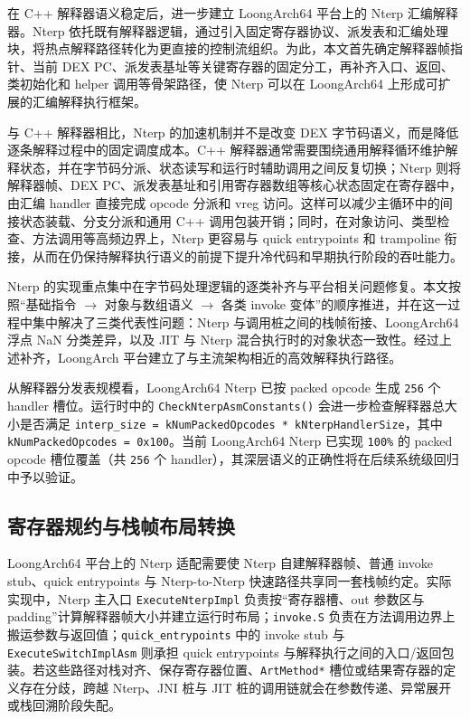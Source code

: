 在 C++ 解释器语义稳定后，进一步建立 LoongArch64 平台上的 Nterp 汇编解释器。Nterp 依托既有解释器逻辑，通过引入固定寄存器协议、派发表和汇编处理块，将热点解释路径转化为更直接的控制流组织\citep{Ertl2003,ArtJitCompiler2024}。为此，本文首先确定解释器帧指针、当前 DEX PC、派发表基址等关键寄存器的固定分工，再补齐入口、返回、类初始化和 helper 调用等骨架路径，使 Nterp 可以在 LoongArch64 上形成可扩展的汇编解释执行框架。

与 C++ 解释器相比，Nterp 的加速机制并不是改变 DEX 字节码语义，而是降低逐条解释过程中的固定调度成本。C++ 解释器通常需要围绕通用解释循环维护解释状态，并在字节码分派、状态读写和运行时辅助调用之间反复切换；Nterp 则将解释器帧、DEX PC、派发表基址和引用寄存器数组等核心状态固定在寄存器中，由汇编 handler 直接完成 opcode 分派和 vreg 访问。这样可以减少主循环中的间接状态装载、分支分派和通用 C++ 调用包装开销；同时，在对象访问、类型检查、方法调用等高频边界上，Nterp 更容易与 quick entrypoints 和 trampoline 衔接，从而在仍保持解释执行语义的前提下提升冷代码和早期执行阶段的吞吐能力。

Nterp 的实现重点集中在字节码处理逻辑的逐类补齐与平台相关问题修复。本文按照“基础指令 $\rightarrow$ 对象与数组语义 $\rightarrow$ 各类 invoke 变体”的顺序推进，并在这一过程中集中解决了三类代表性问题：Nterp 与调用桩之间的栈帧衔接、LoongArch64 浮点 NaN 分类差异，以及 JIT 与 Nterp 混合执行时的对象状态一致性。经过上述补齐，LoongArch 平台建立了与主流架构相近的高效解释执行路径。

从解释器分发表规模看，LoongArch64 Nterp 已按 packed opcode 生成 \texttt{256} 个 handler 槽位。运行时中的 \texttt{CheckNterpAsmConstants()} 会进一步检查解释器总大小是否满足 \texttt{interp\_size = kNumPackedOpcodes * kNterpHandlerSize}，其中 \texttt{kNumPackedOpcodes = 0x100}。当前 LoongArch64 Nterp 已实现 \texttt{100\%} 的 packed opcode 槽位覆盖（共 \texttt{256} 个 handler），其深层语义的正确性将在后续系统级回归中予以验证。

\subsection{寄存器规约与栈帧布局转换}

LoongArch64 平台上的 Nterp 适配需要使 Nterp 自建解释器帧、普通 invoke stub、quick entrypoints 与 Nterp-to-Nterp 快速路径共享同一套栈帧约定。实际实现中，Nterp 主入口 \texttt{ExecuteNterpImpl} 负责按“寄存器槽、out 参数区与 padding”计算解释器帧大小并建立运行时布局；\texttt{invoke.S} 负责在方法调用边界上搬运参数与返回值；\texttt{quick\_entrypoints} 中的 invoke stub 与 \texttt{ExecuteSwitchImplAsm} 则承担 quick entrypoints 与解释执行之间的入口/返回包装。若这些路径对栈对齐、保存寄存器位置、\texttt{ArtMethod*} 槽位或结果寄存器的定义存在分歧，跨越 Nterp、JNI 桩与 JIT 桩的调用链就会在参数传递、异常展开或栈回溯阶段失配。

